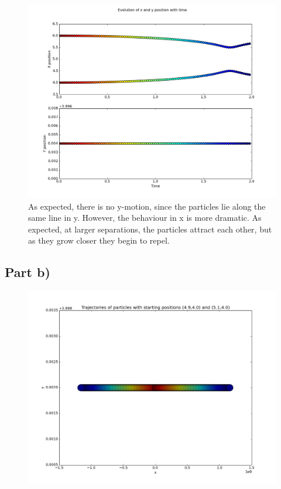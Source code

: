 \documentclass[a4paper,12pt]{article}
\begin{document}
\begin{figure}[H]
\centering
\includegraphics[width = \linewidth]{lab6q5ai.png}
\caption{As expected, there is no y-motion, since the particles lie along the same line in y. However, the behaviour in x is more dramatic. As expected, at larger separations, the particles attract each other, but as they grow closer they begin to repel.}
\label{fig:q5ai}
\end{figure}

\subsection{Part b)}

\begin{figure}[H]
\centering
\includegraphics[width = \linewidth]{lab6q5b.png}
\caption{}
\label{fig:q5b}
\end{figure}
\end{document}
